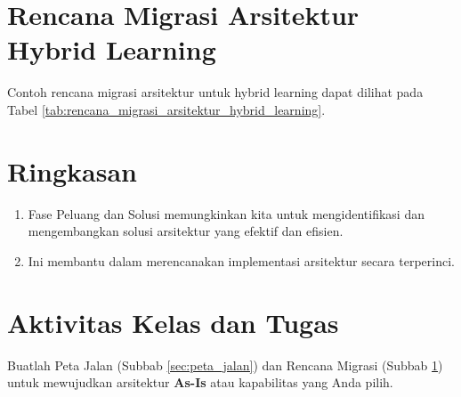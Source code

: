 \section{Rencana Migrasi Arsitektur Hybrid Learning}
\label{sec:rencana_migrasi}
Contoh rencana migrasi arsitektur untuk hybrid learning dapat dilihat pada Tabel \ref{tab:rencana_migrasi_arsitektur_hybrid_learning}.

\section{Ringkasan}
\begin{enumerate}
	\item Fase Peluang dan Solusi memungkinkan kita untuk mengidentifikasi dan mengembangkan solusi arsitektur yang efektif dan efisien.
	\item Ini membantu dalam merencanakan implementasi arsitektur secara terperinci.
\end{enumerate}

\section{Aktivitas Kelas dan Tugas}
Buatlah Peta Jalan (Subbab \ref{sec:peta_jalan}) dan Rencana Migrasi (Subbab \ref{sec:rencana_migrasi}) untuk mewujudkan arsitektur \textbf{As-Is} atau kapabilitas yang Anda pilih.